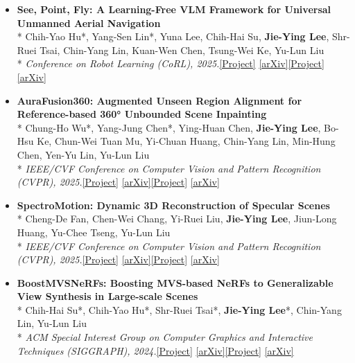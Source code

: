 \documentclass[a4paper,10pt]{extarticle}
\newcommand{\link}[2]{\href{#1}{\color{accent}[#2]}}
\newenvironment{cvlist}
  {\begin{itemize}[leftmargin=1em, itemsep=2pt, topsep=0pt, parsep=0pt, label=\textbullet]}
  {\end{itemize}}
\newcommand{\pub}[4]{%
  \item \textbf{#1}\\*
  #2\\*
  {\small\textit{#3}\ifx\relax#4\relax\else\quad #4\fi}}
\begin{document}
\begin{cvlist}
\pub{See, Point, Fly: A Learning-Free VLM Framework for Universal Unmanned Aerial Navigation}
    {Chih-Yao Hu*, Yang-Sen Lin*, Yuna Lee, Chih-Hai Su, \textbf{Jie-Ying Lee}, Shr-Ruei Tsai, Chin-Yang Lin, Kuan-Wen Chen, Tsung-Wei Ke, Yu-Lun Liu}
    {Conference on Robot Learning (CoRL), 2025.}
    {\link{https://spf-web.pages.dev/}{Project} \link{https://arxiv.org/abs/2509.22653}{arXiv}}

\pub{AuraFusion360: Augmented Unseen Region Alignment for Reference-based 360° Unbounded Scene Inpainting}
    {Chung-Ho Wu*, Yang-Jung Chen*, Ying-Huan Chen, \textbf{Jie-Ying Lee}, Bo-Hsu Ke, Chun-Wei Tuan Mu, Yi-Chuan Huang, Chin-Yang Lin, Min-Hung Chen, Yen-Yu Lin, Yu-Lun Liu}
    {IEEE/CVF Conference on Computer Vision and Pattern Recognition (CVPR), 2025.}
    {\link{https://kkennethwu.github.io/aurafusion360/}{Project} \link{https://arxiv.org/abs/2502.05176}{arXiv}}

\pub{SpectroMotion: Dynamic 3D Reconstruction of Specular Scenes}
    {Cheng-De Fan, Chen-Wei Chang, Yi-Ruei Liu, \textbf{Jie-Ying Lee}, Jiun-Long Huang, Yu-Chee Tseng, Yu-Lun Liu}
    {IEEE/CVF Conference on Computer Vision and Pattern Recognition (CVPR), 2025.}
    {\link{https://cdfan0627.github.io/spectromotion/}{Project} \link{https://arxiv.org/abs/2410.17249}{arXiv}}

\pub{BoostMVSNeRFs: Boosting MVS-based NeRFs to Generalizable View Synthesis in Large-scale Scenes}
    {Chih-Hai Su*, Chih-Yao Hu*, Shr-Ruei Tsai*, \textbf{Jie-Ying Lee}*, Chin-Yang Lin, Yu-Lun Liu}
    {ACM Special Interest Group on Computer Graphics and Interactive Techniques (SIGGRAPH), 2024.}
    {\link{https://su-terry.github.io/BoostMVSNeRFs/}{Project} \link{https://arxiv.org/abs/2407.15848}{arXiv}}
\end{cvlist}

\end{document}
